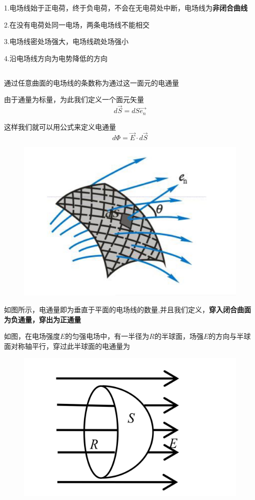 \documentclass[lang=cn,10pt]{elegantbook}
\begin{document}
		\begin{note}
			1.电场线始于正电荷，终于负电荷，不会在无电荷处中断，电场线为\textbf{非闭合曲线}
			
			2.在没有电荷处同一电场，两条电场线不能相交
			
			3.电场线密处场强大，电场线疏处场强小
			
			4.沿电场线方向为电势降低的方向
		\end{note}
		\subsection{\color{red} }
		\begin{definition}[电通量]
			通过任意曲面的电场线的条数称为通过这一面元的电通量
		\end{definition}
		由于通量为标量，为此我们定义一个面元矢量
		\begin{equation*}
			d\overrightarrow{S}=dS\overrightarrow{e_n}
		\end{equation*}
		
		这样我们就可以用公式来定义电通量
		\begin{equation*}
			d\varPhi =\overrightarrow{E}\cdot d\overrightarrow{S}
		\end{equation*}
		\begin{figure}[H]
		\centering
		\includegraphics[width=0.3\linewidth]{image/IMG_0411(20231116-200901)}
		\caption{}
		\label{fig:img041120231116-200901}
		\end{figure}
		
		如图所示，电通量即为垂直于平面的电场线的数量,并且我们定义，\textbf{穿入闭合曲面为负通量，穿出为正通量}
		\begin{example}
			如图，在电场强度$E$的匀强电场中，有一半径为$R$的半球面，场强$E$的方向与半球面对称轴平行，穿过此半球面的电通量为
\begin{figure}[H]
	\centering
	\includegraphics[width=0.18\linewidth]{image/IMG_0413(20231116-202109)}
	\caption{}
	\label{fig:img041320231116-202109}
\end{figure}
		\end{example}
		
\end{document}
